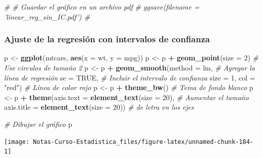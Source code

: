 \documentclass[
  12pt,
]{book}
\newenvironment{Shaded}{\begin{snugshade}}{\end{snugshade}}
\newcommand{\CommentTok}[1]{\textcolor[rgb]{0.56,0.35,0.01}{\textit{#1}}}
\newcommand{\DataTypeTok}[1]{\textcolor[rgb]{0.13,0.29,0.53}{#1}}
\newcommand{\DecValTok}[1]{\textcolor[rgb]{0.00,0.00,0.81}{#1}}
\newcommand{\KeywordTok}[1]{\textcolor[rgb]{0.13,0.29,0.53}{\textbf{#1}}}
\newcommand{\NormalTok}[1]{#1}
\newcommand{\OperatorTok}[1]{\textcolor[rgb]{0.81,0.36,0.00}{\textbf{#1}}}
\newcommand{\OtherTok}[1]{\textcolor[rgb]{0.56,0.35,0.01}{#1}}
\newcommand{\StringTok}[1]{\textcolor[rgb]{0.31,0.60,0.02}{#1}}
\theoremstyle{definition}
\theoremstyle{definition}
\theoremstyle{definition}
\theoremstyle{remark}
\begin{document}
\begin{Shaded}
\begin{Highlighting}[]
\CommentTok{# # Guardar el gráfico en un archivo pdf}
\CommentTok{# ggsave(filename = 'linear_reg_sin_IC.pdf') # }
\end{Highlighting}
\end{Shaded}

\hypertarget{ajuste-de-la-regresiuxf3n-con-intervalos-de-confianza}{%
\subsubsection{Ajuste de la regresión con intervalos de confianza}\label{ajuste-de-la-regresiuxf3n-con-intervalos-de-confianza}}

\begin{Shaded}
\begin{Highlighting}[]
\NormalTok{p <-}\StringTok{ }\KeywordTok{ggplot}\NormalTok{(mtcars, }\KeywordTok{aes}\NormalTok{(}\DataTypeTok{x =}\NormalTok{ wt, }\DataTypeTok{y =}\NormalTok{ mpg)) }
\NormalTok{p <-}\StringTok{ }\NormalTok{p }\OperatorTok{+}\StringTok{ }\KeywordTok{geom_point}\NormalTok{(}\DataTypeTok{size =} \DecValTok{2}\NormalTok{)       }\CommentTok{# Use circulos de tamaño 2}
\NormalTok{p <-}\StringTok{ }\NormalTok{p }\OperatorTok{+}\StringTok{ }\KeywordTok{geom_smooth}\NormalTok{(}\DataTypeTok{method =}\NormalTok{ lm,   }\CommentTok{# Agregar la línea de regresión }
              \DataTypeTok{se =} \OtherTok{TRUE}\NormalTok{,            }\CommentTok{# Incluir el intervalo de confianza   }
              \DataTypeTok{size =} \DecValTok{1}\NormalTok{,}
              \DataTypeTok{col =} \StringTok{"red"}\NormalTok{)          }\CommentTok{# Línea de color rojo }
\NormalTok{p <-}\StringTok{ }\NormalTok{p }\OperatorTok{+}\StringTok{ }\KeywordTok{theme_bw}\NormalTok{()                 }\CommentTok{# Tema de fondo blanco}
\NormalTok{p <-}\StringTok{ }\NormalTok{p }\OperatorTok{+}\StringTok{ }\KeywordTok{theme}\NormalTok{(}\DataTypeTok{axis.text =} \KeywordTok{element_text}\NormalTok{(}\DataTypeTok{size =} \DecValTok{20}\NormalTok{),  }\CommentTok{# Aumentar el tamaño }
               \DataTypeTok{axis.title =} \KeywordTok{element_text}\NormalTok{(}\DataTypeTok{size =} \DecValTok{20}\NormalTok{)) }\CommentTok{# de letra en los ejes}

\CommentTok{# Dibujar el gráfico}
\NormalTok{p   }
\end{Highlighting}
\end{Shaded}

\begin{center}\texttt{[image: Notas-Curso-Estadistica\_files/figure-latex/unnamed-chunk-184-1]} \end{center}
\end{document}
